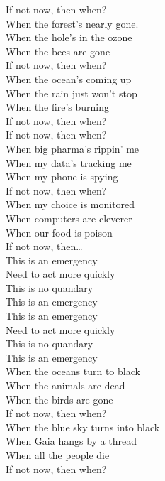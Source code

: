 \label{album:lw}




If not now, then when? \\
When the forest's nearly gone.\\
When the hole's in the ozone \\
When the bees are gone \\
If not now, then when? \\
When the ocean's coming up \\
When the rain just won't stop \\
When the fire's burning \\
If not now, then when? \\

If not now, then when? \\
When big pharma's rippin' me \\
When my data's tracking me \\
When my phone is spying \\
If not now, then when? \\
When my choice is monitored \\
When computers are cleverer \\
When our food is poison \\
If not now, then… \\

This is an emergency \\
Need to act more quickly \\
This is no quandary \\
This is an emergency \\

This is an emergency \\
Need to act more quickly \\
This is no quandary \\
This is an emergency \\

When the oceans turn to black \\
When the animals are dead \\
When the birds are gone \\
If not now, then when? \\
When the blue sky turns into black \\
When Gaia hangs by a thread \\
When all the people die \\
If not now, then when? \\

